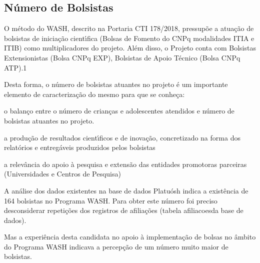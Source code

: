 \documentclass[
12pt,		%
openright,	%
twoside,  %
a4paper,			%
chapter=TITLE,		%
english,			%
french,				%
spanish,			%
brazil				%
]{USPSC-classe/USPSC}
\begin{document}
\subsection[N\'umero de Bolsistas]{N\'umero de Bolsistas}\label{N\'umero de Bolsistas}
O m\'etodo do WASH, descrito na Portaria CTI 178/2018, pressup\~oe a atua\c{c}\~ao de bolsistas de inicia\c{c}\~ao cient\'{\i}fica (Bolsas de Fomento do CNPq modalidades ITIA e ITIB) como multiplicadores do projeto. Al\'em disso, o Projeto conta com Bolsistas Extensionistas (Bolsa CNPq EXP), Bolsistas de Apoio T\'ecnico (Bolsa CNPq ATP).1









Desta forma, o n\'umero de bolsistas atuantes no projeto \'e um importante elemento de caracteriza\c{c}\~ao do mesmo para que se conhe\c{c}a:










\begin{alineas}
\item o balan\c{c}o entre o n\'umero de crian\c{c}as e adolescentes atendidos e n\'umero de  bolsistas atuantes no projeto.
\item a produ\c{c}\~ao de resultados cient\'{\i}ficos e de inova\c{c}\~ao, concretizado na forma dos relat\'orios  e entreg\'aveis produzidos pelos bolsistas
\item a relev\^ancia do apoio \`a pesquisa e extens\~ao das entidades promotoras parceiras (Universidades e Centros de Pesquisa)
\end{alineas}

A an\'alise dos dados existentes na base de dados Platu\'osh indica a exist\^encia de 164 bolsistas no Programa WASH. Para obter este n\'umero foi preciso desconsiderar repeti\c{c}\~oes dos registros de afilia\c{c}\~oes (tabela \textquotedbl afiliacoes\textquotedbl  da base de dados).









Mas a experi\^encia desta candidata no apoio \`a implementa\c{c}\~ao de bolsas no \^ambito do Programa WASH indicava a percep\c{c}\~ao de um n\'umero muito maior de bolsistas.
\end{document}
